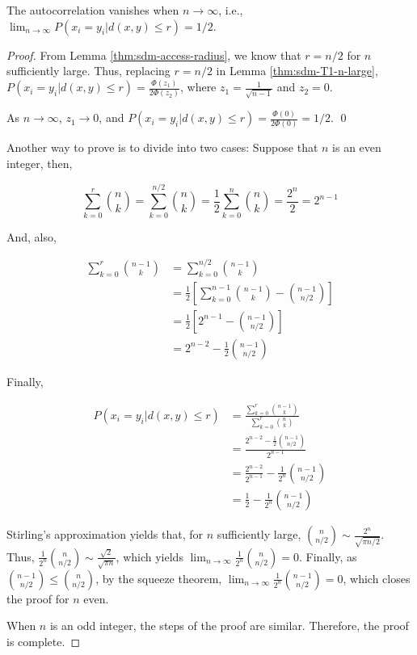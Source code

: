 \begin{theorem}
The autocorrelation vanishes when $n \rightarrow \infty$, i.e., $\lim_{n \rightarrow \infty} P(x_i = y_i | d(x, y) \le r) = 1/2$.
\label{thm:sdm-autocorrelation-convergence}
\end{theorem}
\begin{proof}

From Lemma \ref{thm:sdm-access-radius}, we know that $r = n/2$ for $n$ sufficiently large. Thus, replacing $r = n/2$ in Lemma \ref{thm:sdm-T1-n-large}, $P(x_i = y_i | d(x, y) \le r) = \frac{\Phi(z_1)}{2 \Phi(z_2)}$, where $z_1 = \frac{1}{\sqrt{n-1}}$ and $z_2 = 0$.

As $n \rightarrow \infty$, $z_1 \rightarrow 0$, and $P(x_i = y_i | d(x, y) \le r) = \frac{\Phi(0)}{2 \Phi(0)} = 1/2$. \qed

\bigskip
Another way to prove is to divide into two cases:  Suppose that $n$ is an even integer, then,

$$
\sum_{k=0}^{r} \binom{n}{k} = \sum_{k=0}^{n/2} \binom{n}{k} = \frac{1}{2} \sum_{k=0}^{n} \binom{n}{k} = \frac{2^n}{2} = 2^{n-1}
$$

And, also,

\begin{align*}
\sum_{k=0}^{r} \binom{n-1}{k} &= \sum_{k=0}^{n/2} \binom{n-1}{k} \\
    &= \frac{1}{2} \left[ \sum_{k=0}^{n-1} \binom{n-1}{k} - \binom{n-1}{n/2} \right] \\
    &= \frac{1}{2} \left[ 2^{n-1} - \binom{n-1}{n/2} \right] \\
    &= 2^{n-2} - \frac{1}{2} \binom{n-1}{n/2}
\end{align*}

Finally,

\begin{align}
P(x_i = y_i | d(x, y) \le r) &= \frac{\sum_{k=0}^{r} \binom{n-1}{k}}{\sum_{k=0}^{r} \binom{n}{k}} \\
    &= \frac{2^{n-2} - \frac{1}{2} \binom{n-1}{n/2}}{2^{n-1}} \\
    &= \frac{2^{n-2}}{2^{n-1}} - \frac{1}{2^n} \binom{n-1}{n/2} \\
    &= \frac{1}{2} - \frac{1}{2^n} \binom{n-1}{n/2}
\end{align}

Stirling's approximation yields that, for $n$ sufficiently large, $\binom{n}{n/2} \sim \frac{2^n}{\sqrt{\pi n/2}}$. Thus, $\frac{1}{2^n} \binom{n}{n/2} \sim \frac{\sqrt{2}}{\sqrt{\pi n}}$, which yields $\lim_{n \rightarrow \infty} \frac{1}{2^n} \binom{n}{n/2} = 0$. Finally, as $\binom{n-1}{n/2} \le \binom{n}{n/2}$, by the squeeze theorem, $\lim_{n \rightarrow \infty} \frac{1}{2^n} \binom{n-1}{n/2} = 0$, which closes the proof for $n$ even.

When $n$ is an odd integer, the steps of the proof are similar. Therefore, the proof is complete.

\end{proof}

